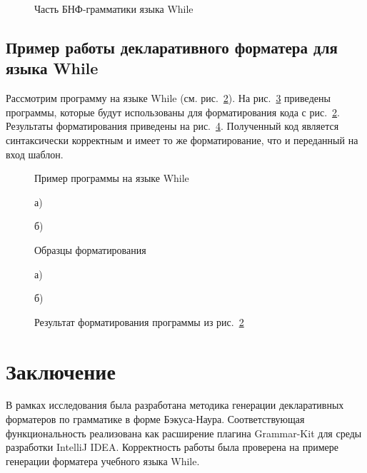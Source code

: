 \documentclass[conference]{IEEEtran}
\begin{document}
\begin{figure}[h]
	\centering
	
	\caption{Часть БНФ-грамматики языка While}
	\label{whileBnf}
\end{figure}

\subsection{Пример работы декларативного форматера для языка While}
Рассмотрим программу на языке While (см. рис.~\ref{whileProg}).
На рис.~\ref{whileTs} приведены программы, которые будут
использованы для форматирования кода с рис.~\ref{whileProg}.
Результаты форматирования приведены на рис.~\ref{whileRes}.
Полученный код является синтаксически корректным и имеет то же форматирование, что и переданный на вход шаблон.

\begin{figure}[h]
	\centering
	
	\caption{Пример программы на языке While}
	\label{whileProg}
\end{figure}

\begin{figure}[ht]
\noindent\begin{minipage}{.2\textwidth}
    
\caption*{а)}    
\end{minipage}\hfill
\begin{minipage}{.2\textwidth}
    
\caption*{б)}    
\end{minipage}
\caption{Образцы форматирования}    
\label{whileTs}
\end{figure}

\begin{figure}[ht]
\noindent\begin{minipage}{.2\textwidth}
    
\caption*{а)}    
\end{minipage}\hfill
\begin{minipage}{.2\textwidth}
    
\caption*{б)}    
\end{minipage}
\caption{Результат форматирования программы из рис.~\ref{whileProg}}
\label{whileRes}
\end{figure}

\section{Заключение}
В рамках исследования была разработана методика генерации декларативных
форматеров по грамматике в форме Бэкуса-Наура.
Соответствующая функциональность реализована как расширение плагина
Grammar-Kit для среды разработки IntelliJ IDEA.
Корректность работы была проверена на примере генерации форматера
учебного языка While.
\end{document}
